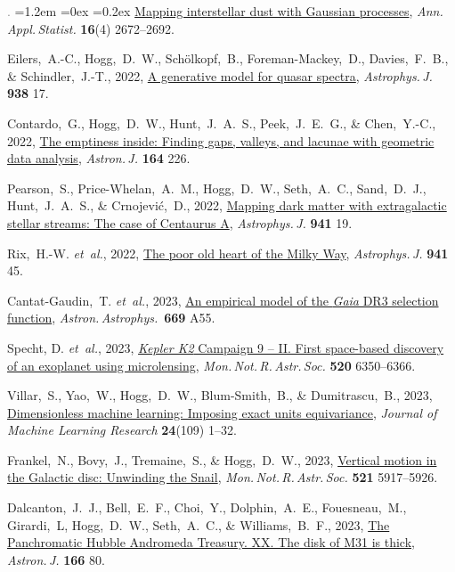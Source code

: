 \documentclass[10pt,letterpaper]{article}
\newcommand{\foreign}[1]{\textsl{#1}}
\newcommand{\etal}{\foreign{et~al.}}
\newcommand{\project}[1]{\textsl{#1}}
\newcommand{\doi}[2]{\href{http://dx.doi.org/#1}{{#2}}}
\newcommand{\deemph}[1]{\textcolor{grey}{\footnotesize{#1}}}
\newcommand{\pubnumber}[1]{\deemph{{#1}.}}
\newcounter{refpubnum}
\newcommand{\hogglist}{%
    \rightmargin=0in
    \leftmargin=1.2em
    \topsep=0ex
    \partopsep=0pt
    \itemsep=0.2ex
    \parsep=0pt
    \itemindent=-1.0\leftmargin
    \listparindent=0.0\leftmargin
    \settowidth{\labelsep}{~}
    \usecounter{refpubnum}
  }
\begin{document}
\begin{list}{\pubnumber{\therefpubnum}}{\hogglist}
  \doi{10.1214/22-AOAS1608}{Mapping interstellar dust with Gaussian processes},
  \textit{Ann.\,Appl.\,Statist.} \textbf{16}(4) 2672--2692.
\item
  Eilers,~A.-C., Hogg,~D.~W., Sch\"olkopf,~B., Foreman-Mackey,~D., Davies,~F.~B.,
  \& Schindler,~J.-T., 2022,
  \doi{10.3847/1538-4357/ac8ead}{A generative model for quasar spectra},
  \textit{Astrophys.\,J.} \textbf{938} 17.
\item
  Contardo,~G., Hogg,~D.~W., Hunt,~J.~A.~S., Peek,~J.~E.~G., \& Chen,~Y.-C., 2022,
  \doi{10.3847/1538-3881/ac961e}{The emptiness inside: Finding gaps, valleys, and lacunae with geometric data analysis},
  \textit{Astron.\,J.} \textbf{164} 226.
\item
  Pearson,~S., Price-Whelan,~A.~M., Hogg,~D.~W., Seth,~A.~C., Sand,~D.~J., Hunt,~J.~A.~S.,
  \& Crnojevi\'c,~D., 2022,
  \doi{10.3847/1538-4357/ac9bfb}{Mapping dark matter with extragalactic stellar streams: The case of Centaurus A},
  \textit{Astrophys.\,J.} \textbf{941} 19.
\item
  Rix,~H.-W. \etal, 2022,
  \doi{10.3847/1538-4357/ac9e01}{The poor old heart of the Milky Way},
  \textit{Astrophys.\,J.} \textbf{941} 45.
\item
  Cantat-Gaudin,~T. \etal, 2023,
  \doi{10.1051/0004-6361/202244784}{An empirical model of the \project{Gaia} DR3 selection function},
  \textit{Astron.\,Astrophys.}\ \textbf{669} A55.
\item
  Specht, D. \etal, 2023,
  \doi{10.1093/mnras/stad212}{\project{Kepler K2} Campaign 9 -- II. First space-based discovery of an exoplanet using microlensing},
  \textit{Mon.\,Not.\,R.\,Astr.\,Soc.} \textbf{520} 6350--6366.
\item
  Villar,~S., Yao,~W., Hogg,~D.~W., Blum-Smith,~B., \& Dumitrascu,~B., 2023,
  \href{https://jmlr.org/papers/v24/22-0680.html}{Dimensionless machine learning: Imposing exact units equivariance},
  \textit{Journal of Machine Learning Research} \textbf{24}(109) 1--32.
\item
  Frankel,~N., Bovy,~J., Tremaine,~S., \& Hogg,~D.~W., 2023,
  \doi{10.1093/mnras/stad908}{Vertical motion in the Galactic disc: Unwinding the Snail},
  \textit{Mon.\,Not.\,R.\,Astr.\,Soc.} \textbf{521} 5917--5926.
\item
  Dalcanton,~J.~J., Bell,~E.~F., Choi,~Y., Dolphin,~A.~E., Fouesneau,~M., Girardi,~L,
  Hogg,~D.~W., Seth,~A.~C., \& Williams,~B.~F., 2023,
  \doi{10.3847/1538-3881/accc83}{The Panchromatic Hubble Andromeda Treasury. XX. The disk of M31 is thick},
  \textit{Astron.\,J.} \textbf{166} 80.

\end{list}
\end{document}
